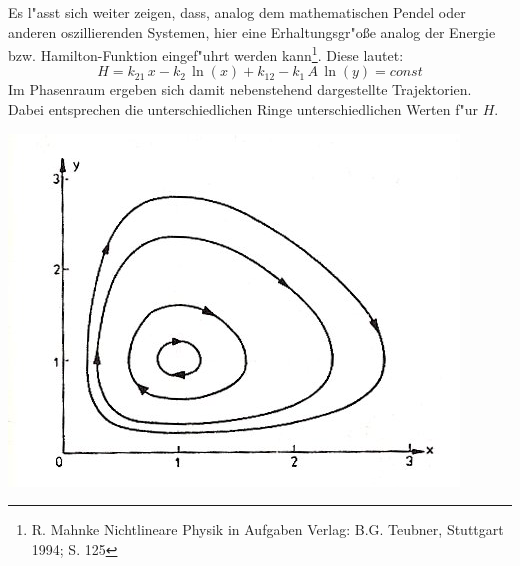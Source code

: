 \documentclass[11pt]{article}
\begin{document}
\begin{minipage}[b]{0.6\textwidth}
Es l"asst sich weiter zeigen, dass, analog dem mathematischen Pendel oder anderen oszillierenden Systemen, hier eine Erhaltungsgr"o\ss e analog der Energie bzw. Hamilton-Funktion eingef"uhrt werden kann\footnote{R. Mahnke \glqq Nichtlineare Physik in Aufgaben \grqq Verlag: B.G. Teubner, Stuttgart 1994; S. 125}. Diese lautet:
$$H=k_{21}\,x-k_2\,\ln(x)+k_{12}-k_1\,A\,\ln(y)=const$$
Im Phasenraum ergeben sich damit nebenstehend dargestellte Trajektorien. Dabei entsprechen die unterschiedlichen Ringe unterschiedlichen Werten f"ur $H$.
\end{minipage}
\begin{minipage}[b]{0.4\textwidth}
\includegraphics[width=\textwidth]{Bilder/Hamdyn.jpg}
\end{minipage}

\newpage
\end{document}
